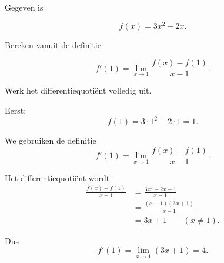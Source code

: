 \documentclass{ximera}
\begin{document}
\begin{oefening}{\oefB\ESS}

Gegeven is

\[
f(x)=3x^2-2x.
\]

Bereken vanuit de definitie

\[
f'(1)
=
\lim_{x\to1}
\frac{f(x)-f(1)}{x-1}.
\]

Werk het differentiequotiënt volledig uit.

\begin{oplossing}

Eerst:
\[
f(1)=3\cdot1^2-2\cdot1=1.
\]

We gebruiken de definitie
\[
f'(1)
=
\lim_{x\to1}
\frac{f(x)-f(1)}{x-1}.
\]

Het differentiequotiënt wordt
\[
\begin{aligned}
\frac{f(x)-f(1)}{x-1}
&=
\frac{3x^2-2x-1}{x-1}\\
&=
\frac{(x-1)(3x+1)}{x-1}\\
&=
3x+1
\qquad (x\neq1).
\end{aligned}
\]

Dus
\[
f'(1)
=
\lim_{x\to1}(3x+1)
=
\boxed{4}.
\]

\end{oplossing}

\end{oefening}


\end{document}
